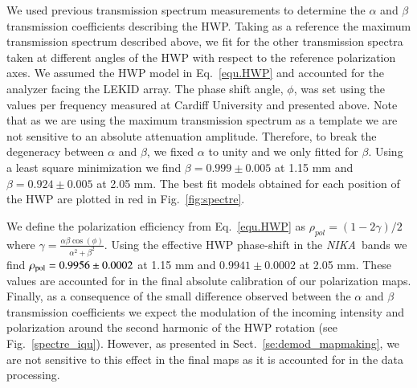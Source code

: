 \documentclass[twocolumn, traditabstract]{aa}
\newcommand{\nika}{{\it NIKA}}
\begin{document}
We used previous transmission spectrum measurements to determine
the $\alpha$ and $\beta$ transmission coefficients describing the HWP.
Taking as a reference the maximum transmission spectrum described above,
we fit for the other transmission spectra taken at different angles of the HWP
with respect to the reference polarization axes. We assumed the 
HWP model in Eq.~\ref{equ.HWP} and accounted for the analyzer facing
the LEKID array. The phase shift angle, $\phi$, was set using the values per frequency measured
at Cardiff University and presented above.
Note that as we are using the maximum transmission
spectrum as a template we are not sensitive to an absolute attenuation amplitude.
Therefore, to break the degeneracy between  $\alpha$ and $\beta$, we fixed $\alpha$ to unity and we
only fitted for $\beta$. Using a least square minimization we find $\beta = 0.999\pm0.005$ at 1.15
mm and $\beta = 0.924\pm0.005$ at 2.05 mm. The best fit models obtained for each position
of the HWP are plotted in red in Fig.~\ref{fig:spectre}.

We define  the polarization efficiency from Eq.~\ref{equ.HWP} as $\rho_{pol} = (1-2\gamma)/2$ where
$\gamma = \frac{\alpha \beta \cos(\phi)}{\alpha^2 + \beta^2}$. Using the effective HWP phase-shift in the \nika\ bands we find $\rho_{\rm
  pol} = 0.9956 \pm 0.0002$ at 1.15 mm and $0.9941 \pm 0.0002$ at 2.05 mm. These values
are accounted for in the final absolute calibration of our polarization
maps. Finally, as a consequence of the small difference observed between the
$\alpha$ and $\beta$ transmission coefficients we expect the modulation of the
incoming intensity and polarization around the second harmonic of the HWP
rotation (see Fig.~\ref{spectre_iqu}). However, as presented in Sect.~\ref{se:demod_mapmaking}, we are not
sensitive to this effect in the final maps as it is accounted for in the data
processing.
\end{document}
